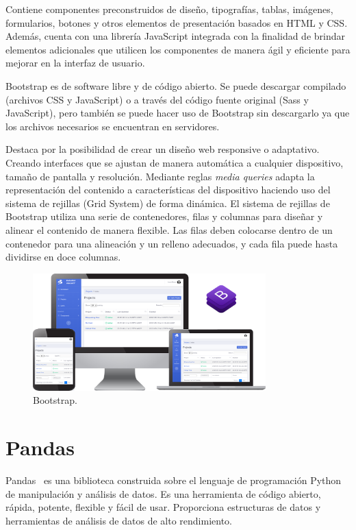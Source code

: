 \documentclass[a4paper, 12pt]{book}
\begin{document}
\vspace{5mm}
Contiene componentes preconstruidos de diseño, tipografías, tablas, imágenes, formularios, botones y otros elementos de presentación basados en HTML y CSS.
Además, cuenta con una librería JavaScript integrada con la finalidad de brindar elementos adicionales que utilicen los componentes de manera ágil y eficiente para mejorar en la interfaz de usuario.

\vspace{5mm}
Bootstrap es de software libre y de código abierto.
Se puede descargar compilado (archivos CSS y JavaScript) o a través del código fuente original (Sass y JavaScript), pero también se puede hacer uso de Bootstrap sin descargarlo ya que los archivos necesarios se encuentran en servidores.

\vspace{5mm}%
Destaca por la posibilidad de crear un diseño web responsive o adaptativo.
Creando interfaces que se ajustan de manera automática a cualquier dispositivo, tamaño de pantalla y resolución.
Mediante reglas \textit{media queries} adapta la representación del contenido a características del dispositivo haciendo uso del sistema de rejillas (Grid System) de forma dinámica.
El sistema de rejillas de Bootstrap utiliza una serie de contenedores, filas y columnas para diseñar y alinear el contenido de manera flexible.
Las filas deben colocarse dentro de un contenedor para una alineación y un relleno adecuados, y cada fila puede hasta dividirse en doce columnas.

\begin{figure}[ht]
  \centering
  \includegraphics[width=9cm, keepaspectratio]{img/bootstrap.png}
  \caption{Bootstrap.}\label{fig:bootstrap}
\end{figure}


\section{Pandas} 
\label{sec:pandas}

Pandas~\cite{pandas} es una biblioteca construida sobre el lenguaje de programación Python de manipulación y análisis de datos.
Es una herramienta de código abierto, rápida, potente, flexible y fácil de usar.
Proporciona estructuras de datos y herramientas de análisis de datos de alto rendimiento.
\end{document}
